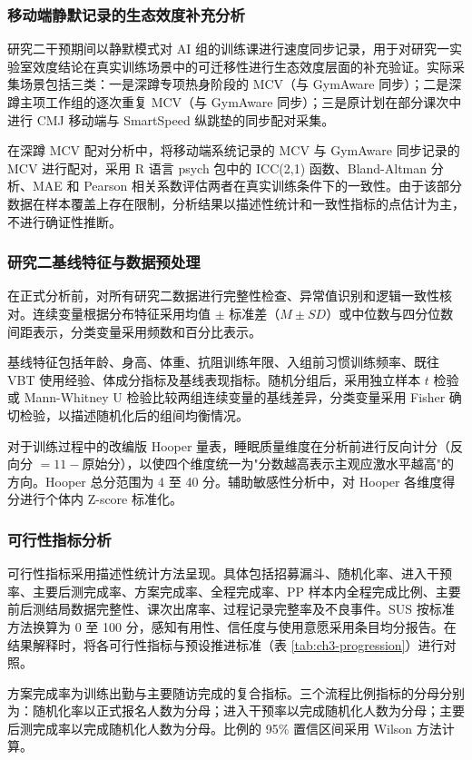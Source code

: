 \documentclass[UTF8,zihao=-4,twoside,openany]{ctexbook}
\begin{document}
\subsubsection{移动端静默记录的生态效度补充分析}
研究二干预期间以静默模式对 AI 组的训练课进行速度同步记录，用于对研究一实验室效度结论在真实训练场景中的可迁移性进行生态效度层面的补充验证。实际采集场景包括三类：一是深蹲专项热身阶段的 MCV（与 GymAware 同步）；二是深蹲主项工作组的逐次重复 MCV（与 GymAware 同步）；三是原计划在部分课次中进行 CMJ 移动端与 SmartSpeed 纵跳垫的同步配对采集。

在深蹲 MCV 配对分析中，将移动端系统记录的 MCV 与 GymAware 同步记录的 MCV 进行配对，采用 R 语言 psych 包中的 ICC(2,1) 函数、Bland-Altman 分析、MAE 和 Pearson 相关系数评估两者在真实训练条件下的一致性。由于该部分数据在样本覆盖上存在限制，分析结果以描述性统计和一致性指标的点估计为主，不进行确证性推断。

\subsubsection{研究二基线特征与数据预处理}
在正式分析前，对所有研究二数据进行完整性检查、异常值识别和逻辑一致性核对。连续变量根据分布特征采用均值 $\pm$ 标准差（$M \pm SD$）或中位数与四分位数间距表示，分类变量采用频数和百分比表示。

基线特征包括年龄、身高、体重、抗阻训练年限、入组前习惯训练频率、既往 VBT 使用经验、体成分指标及基线表现指标。随机分组后，采用独立样本 $t$ 检验或 Mann-Whitney U 检验比较两组连续变量的基线差异，分类变量采用 Fisher 确切检验，以描述随机化后的组间均衡情况。

对于训练过程中的改编版 Hooper 量表，睡眠质量维度在分析前进行反向计分（反向分 $= 11 - \text{原始分}$），以使四个维度统一为"分数越高表示主观应激水平越高"的方向。Hooper 总分范围为 4 至 40 分。辅助敏感性分析中，对 Hooper 各维度得分进行个体内 Z-score 标准化。

\subsubsection{可行性指标分析}
可行性指标采用描述性统计方法呈现。具体包括招募漏斗、随机化率、进入干预率、主要后测完成率、方案完成率、全程完成率、PP 样本内全程完成比例、主要前后测结局数据完整性、课次出席率、过程记录完整率及不良事件。SUS 按标准方法换算为 0 至 100 分，感知有用性、信任度与使用意愿采用条目均分报告。在结果解释时，将各可行性指标与预设推进标准（表 \ref{tab:ch3-progression}）进行对照。

方案完成率为训练出勤与主要随访完成的复合指标。三个流程比例指标的分母分别为：随机化率以正式报名人数为分母；进入干预率以完成随机化人数为分母；主要后测完成率以完成随机化人数为分母。比例的 95\% 置信区间采用 Wilson 方法计算。
\end{document}
